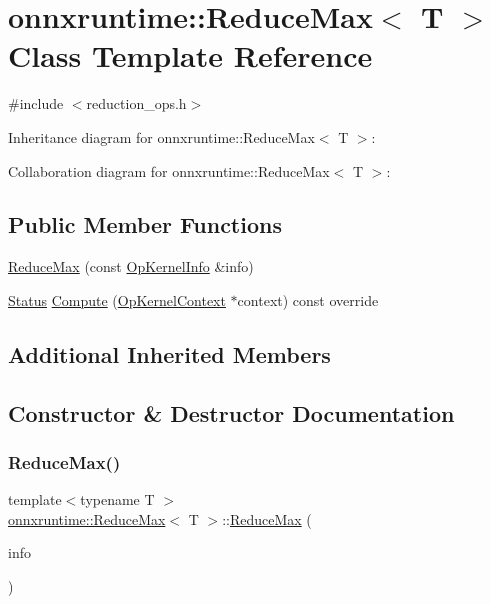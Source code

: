 \hypertarget{classonnxruntime_1_1ReduceMax}{}\section{onnxruntime\+:\+:Reduce\+Max$<$ T $>$ Class Template Reference}
\label{classonnxruntime_1_1ReduceMax}


{\ttfamily \#include $<$reduction\+\_\+ops.\+h$>$}



Inheritance diagram for onnxruntime\+:\+:Reduce\+Max$<$ T $>$\+:


Collaboration diagram for onnxruntime\+:\+:Reduce\+Max$<$ T $>$\+:
\subsection*{Public Member Functions}
\begin{DoxyCompactItemize}
\item 
\mbox{\hyperlink{classonnxruntime_1_1ReduceMax_a0e30e4367f896118b92366a6dff39385}{Reduce\+Max}} (const \mbox{\hyperlink{classonnxruntime_1_1OpKernelInfo}{Op\+Kernel\+Info}} \&info)
\item 
\mbox{\hyperlink{classonnxruntime_1_1common_1_1Status}{Status}} \mbox{\hyperlink{classonnxruntime_1_1ReduceMax_a27262f103f0521fe4c5d4e80174658c2}{Compute}} (\mbox{\hyperlink{classonnxruntime_1_1OpKernelContext}{Op\+Kernel\+Context}} $\ast$context) const override
\end{DoxyCompactItemize}
\subsection*{Additional Inherited Members}


\subsection{Constructor \& Destructor Documentation}
\mbox{\label{classonnxruntime_1_1ReduceMax_a0e30e4367f896118b92366a6dff39385}} 
\subsubsection{\texorpdfstring{Reduce\+Max()}{ReduceMax()}}
{\footnotesize\ttfamily template$<$typename T $>$ \\
\mbox{\hyperlink{classonnxruntime_1_1ReduceMax}{onnxruntime\+::\+Reduce\+Max}}$<$ T $>$\+::\mbox{\hyperlink{classonnxruntime_1_1ReduceMax}{Reduce\+Max}} (\begin{DoxyParamCaption}\item[{const \mbox{\hyperlink{classonnxruntime_1_1OpKernelInfo}{Op\+Kernel\+Info}} \&}]{info }\end{DoxyParamCaption})\hspace{0.3cm}{\ttfamily [inline]}}



